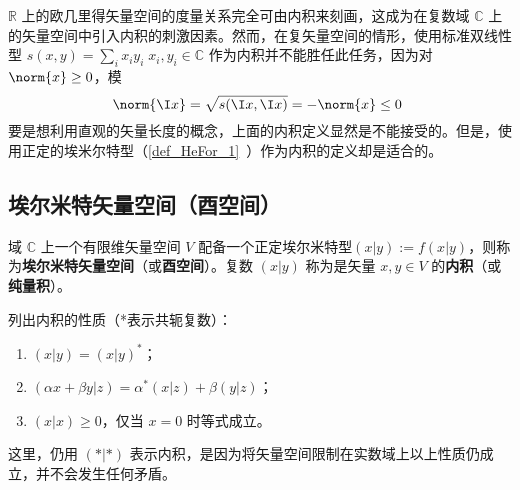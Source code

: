 
\begin{issues}
\issueTODO
\end{issues}

$\mathbb{R}$ 上的欧几里得矢量空间的度量关系完全可由内积来刻画，这成为在复数域 $\mathbb{C}$ 上的矢量空间中引入内积的刺激因素。然而，在复矢量空间的情形，使用标准双线性型 $s( x, y)=\sum_{i}x_iy_i\;x_i,y_i\in\mathbb{C}$ 作为内积并不能胜任此任务，因为对 $\norm{x}\geq0$，模
\begin{equation}
\norm{\I x}=\sqrt{s(\I x,\I x)}=-\norm{ x}\leq0~
\end{equation}
要是想利用直观的矢量长度的概念，上面的内积定义显然是不能接受的。但是，使用正定的埃米尔特型（\autoref{def_HeFor_1}~）作为内积的定义却是适合的。
\subsection{埃尔米特矢量空间（酉空间）}
\begin{definition}{}\label{def_HVorUV_1}
域 $\mathbb{C}$ 上一个有限维矢量空间 $V$ 配备一个正定埃尔米特型$( x|  y):=f(  x|  y)$，则称为\textbf{埃尔米特矢量空间}（或\textbf{酉空间}）。复数 $(  x|  y)$ 称为是矢量 $  x,  y\in V$ 的\textbf{内积}（或\textbf{纯量积}）。
\end{definition}
列出内积的性质（*表示共轭复数）：
\begin{enumerate}
\item $(  x|  y)=(  x|  y)^*$；
\item $(\alpha  x+\beta  y|  z)=\alpha^*(  x|  z)+\beta(  y|  z)$；
\item $(  x|  x)\geq0$，仅当 $  x=  0$ 时等式成立。
\end{enumerate}

这里，仍用 $(*|*)$ 表示内积，是因为将矢量空间限制在实数域上以上性质仍成立，并不会发生任何矛盾。

